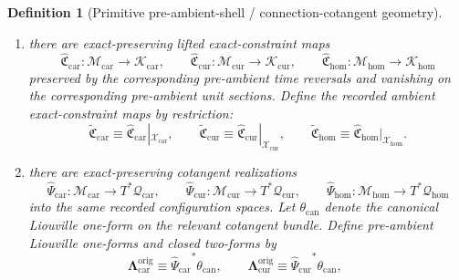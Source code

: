\documentclass[11pt]{article}
\newcommand{\TensorConstraintTarget}{\mathcal K_{\mathrm{car}}}
\newcommand{\CurConstraintTarget}{\mathcal K_{\mathrm{cur}}}
\newcommand{\HomConstraintTarget}{\mathcal K_{\mathrm{hom}}}
\newcommand{\TensorAmbientSpace}{\mathcal X_{\mathrm{car}}}
\newcommand{\CurAmbientSpace}{\mathcal X_{\mathrm{cur}}}
\newcommand{\HomAmbientSpace}{\mathcal X_{\mathrm{hom}}}
\newcommand{\TensorShellSection}{\mathfrak D_{\mathrm{car}}}
\newcommand{\CurShellSection}{\mathfrak D_{\mathrm{cur}}}
\newcommand{\HomShellSection}{\mathfrak D_{\mathrm{hom}}}
\newcommand{\TensorShellGap}{\eta_{\mathrm{car}}}
\newcommand{\CurShellGap}{\eta_{\mathrm{cur}}}
\newcommand{\HomShellGap}{\eta_{\mathrm{hom}}}
\newcommand{\TensorAmbientConstraintMap}{\widetilde{\mathfrak C}_{\mathrm{car}}}
\newcommand{\CurAmbientConstraintMap}{\widetilde{\mathfrak C}_{\mathrm{cur}}}
\newcommand{\HomAmbientConstraintMap}{\widetilde{\mathfrak C}_{\mathrm{hom}}}
\newcommand{\TensorConfigSpace}{\mathcal Q_{\mathrm{car}}}
\newcommand{\CurConfigSpace}{\mathcal Q_{\mathrm{cur}}}
\newcommand{\HomConfigSpace}{\mathcal Q_{\mathrm{hom}}}
\newcommand{\TensorOriginSpace}{\mathcal M_{\mathrm{car}}}
\newcommand{\CurOriginSpace}{\mathcal M_{\mathrm{cur}}}
\newcommand{\HomOriginSpace}{\mathcal M_{\mathrm{hom}}}
\newcommand{\TensorLiftedShellSection}{\widehat{\mathfrak D}_{\mathrm{car}}}
\newcommand{\CurLiftedShellSection}{\widehat{\mathfrak D}_{\mathrm{cur}}}
\newcommand{\HomLiftedShellSection}{\widehat{\mathfrak D}_{\mathrm{hom}}}
\newcommand{\TensorOriginConstraintMap}{\widehat{\mathfrak C}_{\mathrm{car}}}
\newcommand{\CurOriginConstraintMap}{\widehat{\mathfrak C}_{\mathrm{cur}}}
\newcommand{\HomOriginConstraintMap}{\widehat{\mathfrak C}_{\mathrm{hom}}}
\newcommand{\TensorOriginCotangentRealization}{\widehat\Psi_{\mathrm{car}}}
\newcommand{\CurOriginCotangentRealization}{\widehat\Psi_{\mathrm{cur}}}
\newcommand{\HomOriginCotangentRealization}{\widehat\Psi_{\mathrm{hom}}}
\newcommand{\TensorOriginLiouville}{\boldsymbol{\Lambda}_{\mathrm{car}}^{\mathrm{orig}}}
\newcommand{\CurOriginLiouville}{\boldsymbol{\Lambda}_{\mathrm{cur}}^{\mathrm{orig}}}
\newtheorem{definition}{Definition}
\begin{document}
\begin{definition}[Primitive pre-ambient-shell / connection-cotangent geometry]
\begin{enumerate}
\[    \]
    preserved by the corresponding pre-ambient time reversals and vanishing on the corresponding pre-ambient unit sections. Define the recorded ambient shell sections by restriction:
    \begin{equation}
    \TensorShellSection\equiv\TensorLiftedShellSection|_{\TensorAmbientSpace},\qquad
    \CurShellSection\equiv\CurLiftedShellSection|_{\CurAmbientSpace},\qquad
    \HomShellSection\equiv\HomLiftedShellSection|_{\HomAmbientSpace}.
    \label{eq:ambient_shell_section_from_origin}
    \end{equation}
    Assume these restricted sections satisfy the same recorded positive shell-gap bounds \(\TensorShellGap,\CurShellGap,\HomShellGap>0\) on the current seed shells cut out inside \(\TensorAmbientSpace,\CurAmbientSpace,\HomAmbientSpace\).
    \item there are exact-preserving lifted exact-constraint maps
    \[
    \TensorOriginConstraintMap:\TensorOriginSpace\to\TensorConstraintTarget,\qquad
    \CurOriginConstraintMap:\CurOriginSpace\to\CurConstraintTarget,\qquad
    \HomOriginConstraintMap:\HomOriginSpace\to\HomConstraintTarget
    \]
    preserved by the corresponding pre-ambient time reversals and vanishing on the corresponding pre-ambient unit sections. Define the recorded ambient exact-constraint maps by restriction:
    \begin{equation}
    \TensorAmbientConstraintMap\equiv\TensorOriginConstraintMap|_{\TensorAmbientSpace},\qquad
    \CurAmbientConstraintMap\equiv\CurOriginConstraintMap|_{\CurAmbientSpace},\qquad
    \HomAmbientConstraintMap\equiv\HomOriginConstraintMap|_{\HomAmbientSpace}.
    \label{eq:ambient_constraint_from_origin}
    \end{equation}
    \item there are exact-preserving cotangent realizations
    \[
    \TensorOriginCotangentRealization:\TensorOriginSpace\to T^*\TensorConfigSpace,\qquad
    \CurOriginCotangentRealization:\CurOriginSpace\to T^*\CurConfigSpace,\qquad
    \HomOriginCotangentRealization:\HomOriginSpace\to T^*\HomConfigSpace
    \]
    into the same recorded configuration spaces. Let \(\theta_{\mathrm{can}}\) denote the canonical Liouville one-form on the relevant cotangent bundle. Define pre-ambient Liouville one-forms and closed two-forms by
    \begin{equation}
    \TensorOriginLiouville\equiv{\TensorOriginCotangentRealization}^*\theta_{\mathrm{can}},\qquad
    \CurOriginLiouville\equiv{\CurOriginCotangentRealization}^*\theta_{\mathrm{can}},\qquad

\end{equation}
\end{enumerate}
\end{definition}
\end{document}
